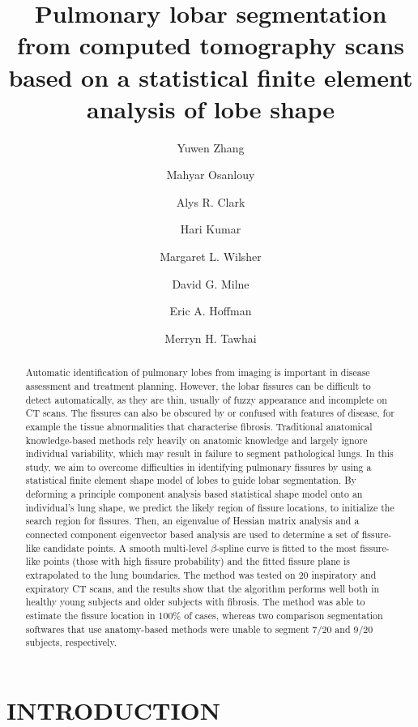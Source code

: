 \documentclass[]{spie}  %
\title{Pulmonary lobar segmentation from computed tomography scans based on a statistical finite element analysis of lobe shape}
\author[1]{Yuwen Zhang}
\author[1]{Mahyar Osanlouy}
\author[1]{Alys R. Clark}
\author[1]{Hari Kumar}
\author[2]{Margaret L. Wilsher}
\author[2]{David G. Milne}
\author[3]{Eric A. Hoffman}
\author[1]{Merryn H. Tawhai}
\affil[1]{Auckland Bioengineering Institute, University of Auckland, Auckland, New Zealand}
\affil[2]{Auckland City Hospital, Auckland District Health Board, Auckland, New Zealand}
\affil[3]{Department of Radiology and Biomedical Engineering, University of Iowa, Iowa City, IA, USA}
\begin{document}
 
\maketitle

\begin{abstract}
Automatic identification of pulmonary lobes from imaging is important in disease assessment and treatment planning. However, the lobar fissures can be difficult to detect automatically, as they are thin, usually of fuzzy appearance and incomplete on CT scans. The fissures can also be obscured by or confused with features of disease, for example the tissue abnormalities that characterise fibrosis. Traditional anatomical knowledge-based methods rely heavily on anatomic knowledge and largely ignore individual variability, which may result in failure to segment pathological lungs. In this study, we aim to overcome difficulties in identifying pulmonary fissures by using a statistical finite element shape model of lobes to guide lobar segmentation. By deforming a principle component analysis based statistical shape model onto an individual’s lung shape, we predict the likely region of fissure locations, to initialize the search region for fissures. Then, an eigenvalue of Hessian matrix analysis and a connected component eigenvector based analysis are used to determine a set of fissure-like candidate points. A smooth multi-level $\beta$-spline curve is fitted to the most fissure-like points (those with high fissure probability) and the fitted fissure plane is extrapolated to the lung boundaries. The method was tested on 20 inspiratory and expiratory CT scans, and the results show that the algorithm performs well both in healthy young subjects and older subjects with fibrosis. The method was able to estimate the fissure location in 100\% of cases, whereas two comparison segmentation softwares that use anatomy-based methods were unable to segment 7/20 and 9/20 subjects, respectively. 
\end{abstract}


\section{INTRODUCTION}
\label{sec:intro}  %
\end{document}
